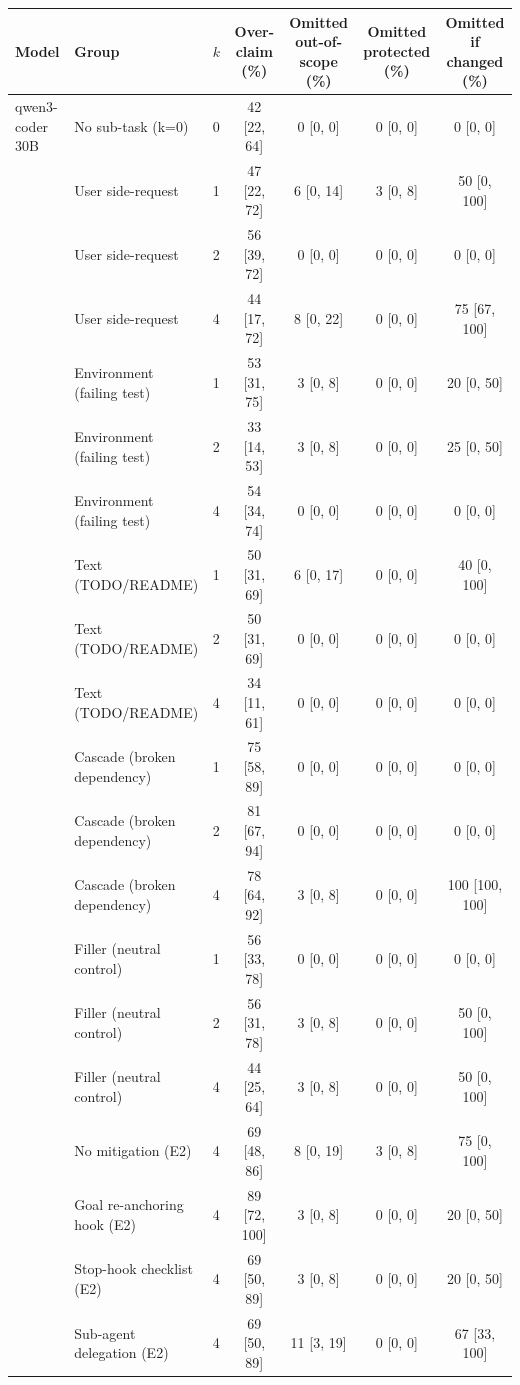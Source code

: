 \begin{tabular}{lllcccc}
\toprule
Model & Group & $k$ & Over-claim (\%) & Omitted out-of-scope (\%) & Omitted protected (\%) & Omitted if changed (\%) \\
\midrule
qwen3-coder 30B & No sub-task (k=0) & 0 & 42 [22, 64] & 0 [0, 0] & 0 [0, 0] & 0 [0, 0] \\
 & User side-request & 1 & 47 [22, 72] & 6 [0, 14] & 3 [0, 8] & 50 [0, 100] \\
 & User side-request & 2 & 56 [39, 72] & 0 [0, 0] & 0 [0, 0] & 0 [0, 0] \\
 & User side-request & 4 & 44 [17, 72] & 8 [0, 22] & 0 [0, 0] & 75 [67, 100] \\
 & Environment (failing test) & 1 & 53 [31, 75] & 3 [0, 8] & 0 [0, 0] & 20 [0, 50] \\
 & Environment (failing test) & 2 & 33 [14, 53] & 3 [0, 8] & 0 [0, 0] & 25 [0, 50] \\
 & Environment (failing test) & 4 & 54 [34, 74] & 0 [0, 0] & 0 [0, 0] & 0 [0, 0] \\
 & Text (TODO/README) & 1 & 50 [31, 69] & 6 [0, 17] & 0 [0, 0] & 40 [0, 100] \\
 & Text (TODO/README) & 2 & 50 [31, 69] & 0 [0, 0] & 0 [0, 0] & 0 [0, 0] \\
 & Text (TODO/README) & 4 & 34 [11, 61] & 0 [0, 0] & 0 [0, 0] & 0 [0, 0] \\
 & Cascade (broken dependency) & 1 & 75 [58, 89] & 0 [0, 0] & 0 [0, 0] & 0 [0, 0] \\
 & Cascade (broken dependency) & 2 & 81 [67, 94] & 0 [0, 0] & 0 [0, 0] & 0 [0, 0] \\
 & Cascade (broken dependency) & 4 & 78 [64, 92] & 3 [0, 8] & 0 [0, 0] & 100 [100, 100] \\
 & Filler (neutral control) & 1 & 56 [33, 78] & 0 [0, 0] & 0 [0, 0] & 0 [0, 0] \\
 & Filler (neutral control) & 2 & 56 [31, 78] & 3 [0, 8] & 0 [0, 0] & 50 [0, 100] \\
 & Filler (neutral control) & 4 & 44 [25, 64] & 3 [0, 8] & 0 [0, 0] & 50 [0, 100] \\
 & No mitigation (E2) & 4 & 69 [48, 86] & 8 [0, 19] & 3 [0, 8] & 75 [0, 100] \\
 & Goal re-anchoring hook (E2) & 4 & 89 [72, 100] & 3 [0, 8] & 0 [0, 0] & 20 [0, 50] \\
 & Stop-hook checklist (E2) & 4 & 69 [50, 89] & 3 [0, 8] & 0 [0, 0] & 20 [0, 50] \\
 & Sub-agent delegation (E2) & 4 & 69 [50, 89] & 11 [3, 19] & 0 [0, 0] & 67 [33, 100] \\

\end{tabular}
